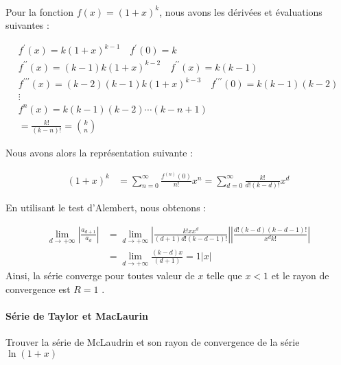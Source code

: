 \documentclass{report}
\begin{document}
\begin{multicols*}{2}
      \mbox{}\\
      Pour la fonction $f(x) = (1 + x)^k $, nous avons les dérivées et 
      évaluations suivantes : 


      \begin{align*}
        f^{\prime}(x) = k(1 + x)^{k - 1}  
            \quad %
        f^{\prime}(0) = k 
            \\ 
        f^{\prime\prime}(x) = (k - 1)k(1 + x)^{k - 2}
            \quad %
        f^{\prime\prime}(x) = k(k - 1)
        \\ 
        f^{\prime\prime\prime}(x) = (k - 2)(k - 1)k(1 + x)^{k - 3}
          \quad %
        f^{\prime\prime\prime}(0) = k(k - 1)(k - 2)
        \\
        \vdots 
        \\
        f^{n}(x) = k(k - 1)(k - 2)\cdots(k - n + 1)
        \\ 
        = \frac{k!}{(k - n)!}  = {k \choose n}
      \end{align*}


      Nous avons alors la représentation suivante : 

      \begin{align*}
        (1 + x)^k &= \sum_{n=0}^{\infty }\frac{f^{(n)}(0)}{n!}x^n 
                  = \sum_{d=0}^{\infty } \frac{k!}{d!(k - d)!}x^d 
      \end{align*}

      En utilisant le test d'Alembert, nous obtenons : 

      \begin{align*}
          \lim\limits_{d \to+\infty }
              \left| 
                  \frac{a_{d+1}}{a_d} 
              \right|
          &= 
          \lim\limits_{d \to+\infty }  
          \left| 
          \frac{k!xx^d}{(d+1)d!(k - d - 1)!} 
          \right|
          \left| 
          \frac{d!(k-d)(k-d -1)!}{x^d k!} 
          \right|
          \\
          &=  
          \lim\limits_{d \to+\infty }\frac{(k - d)x}{(d + 1)} 
          = 
          1|x|
      \end{align*}    
      Ainsi, la série converge pour toutes valeur de $x$ telle que 
      $x < 1$ et le rayon de convergence est $R = 1$ . 



      \paragraph{Série de Taylor et MacLaurin}
      Trouver la série de McLaudrin et son rayon de convergence 
      de la série $\ln(1 + x)$
      

\end{multicols*}
\end{document}
